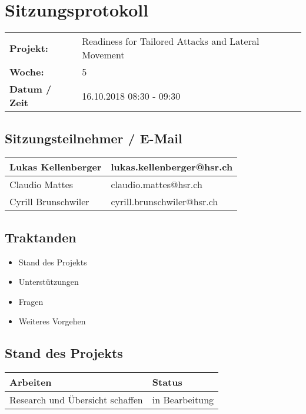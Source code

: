 \newcommand{\TITLE}{Readiness for Tailored Attacks and Lateral Movement Detection}
\newcommand{\REVIEW}{Weekly Meeting}
\newcommand{\VERSION}{0.0}





\section*{Sitzungsprotokoll}

\begin{tabular}{p{4cm} p{12cm}}
    \textbf{Projekt:} & Readiness for Tailored Attacks and Lateral Movement  \\
    \textbf{Woche:} & 5 \\
    \textbf{Datum / Zeit} & 16.10.2018 08:30 - 09:30 \\
\end{tabular}

\subsection*{Sitzungsteilnehmer / E-Mail}
\begin{table}[H]
    \centering
    \begin{tabular}{p{4cm} p{12cm}} \hline
        Lukas Kellenberger & lukas.kellenberger@hsr.ch \\ \hline
        Claudio Mattes & claudio.mattes@hsr.ch \\ \hline
        Cyrill Brunschwiler & cyrill.brunschwiler@hsr.ch \\ \hline
    \end{tabular}
\end{table}

\vspace{1cm}

\subsection*{Traktanden}
\begin{itemize}
    \item Stand des Projekts
    \item Unterstützungen
    \item Fragen
    \item Weiteres Vorgehen
\end{itemize}

\clearpage


\subsection*{Stand des Projekts}
\begin{table}[H]
    \centering
    \begin{tabular}{p{12cm} p{4cm}}
        \textbf{Arbeiten} & \textbf{Status} \\ \hline
        Research und Übersicht schaffen & in Bearbeitung \\ \hline
    \end{tabular}
\end{table}


